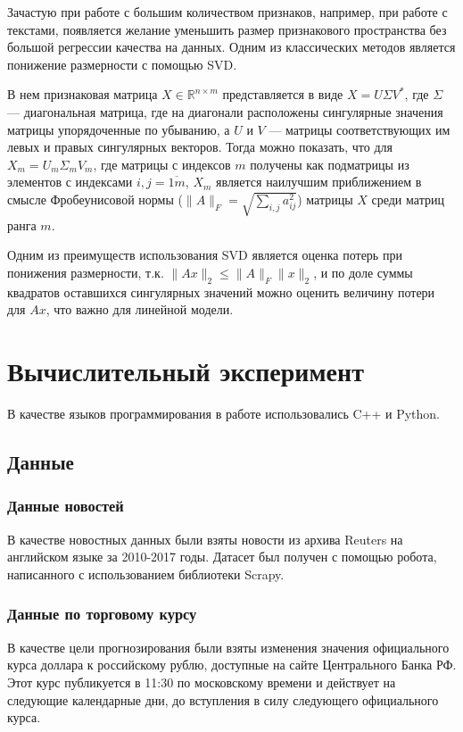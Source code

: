 \documentclass[pdftex,14pt,a4paper]{extreport}
\begin{document}
Зачастую при работе с большим количеством признаков, например, при работе с текстами, появляется желание уменьшить
размер признакового пространства без большой регрессии качества на данных. Одним из классических методов является
понижение размерности с помощью SVD\cite{svd}.

В нем признаковая матрица $X\in\mathbb{R}^{n\times m}$ представляется в виде $X=U\Sigma V^*$, где $\Sigma$ --- диагональная
матрица, где на диагонали расположены сингулярные значения матрицы упорядоченные по убыванию, а $U$ и $V$ --- матрицы 
соответствующих им левых и правых сингулярных векторов. Тогда можно показать, что для $X_m=U_m\Sigma_m V_m$,
где матрицы с индексов $m$ получены как подматрицы из элементов с индексами $i,j=\overline{1m}$,
$X_m$ является наилучшим приближением в смысле Фробеунисовой нормы ($\|A\|_F = \sqrt{\sum_{i,j} a^2_{ij}}$)
матрицы $X$ среди матриц ранга $m$.

Одним из преимуществ использования SVD является оценка потерь при понижения размерности, т.к. $\|Ax\|_2 \leq \|A\|_F\|x\|_2$,
и по доле суммы квадратов оставшихся сингулярных значений можно оценить величину потери для $Ax$, что важно для линейной
модели.

\chapter{Вычислительный эксперимент}

В качестве языков программирования в работе использовались C++ и Python\cite{python}.

\section{Данные}

\subsection{Данные новостей}

В качестве новостных данных были взяты новости из архива Reuters на английском языке за 2010-2017 годы\cite{reuters}. Датасет был получен с помощью робота, написанного с использованием библиотеки Scrapy\cite{scrapy}.

\subsection{Данные по торговому курсу}

В качестве цели прогнозирования были взяты изменения значения официального курса доллара к российскому рублю, доступные
на сайте Центрального Банка РФ\cite{courses}.
Этот курс публикуется в 11:30 по московскому времени и действует на следующие календарные дни, до вступления в силу следующего
официального курса.
\end{document}
